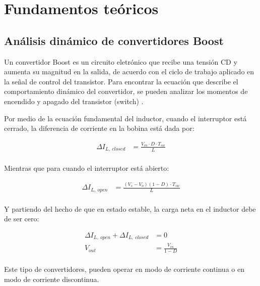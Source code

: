 \documentclass[conference]{IEEEtran}
\begin{document}
\section{Fundamentos teóricos}

\subsection{Análisis dinámico de convertidores Boost}
Un convertidor Boost es un circuito eletrónico que recibe una tensión CD y aumenta su magnitud en la salida, 
de acuerdo con el ciclo de trabajo aplicado en la señal de control del transistor. Para encontrar la ecuación
que describe el comportamiento dinámico del convertidor, se pueden analizar los momentos de encendido y apagado 
del transistor (switch) \cite{hart2011power}.

Por medio de la ecuación fundamental del inductor, cuando el interruptor está cerrado, la diferencia de corriente
en la bobina está dada por:

\begin{equation}
\begin{aligned}
    \Delta I_{L,~closed} &= \frac{V_{in} \cdot D \cdot T_{sw}}{L} \\
\end{aligned}
\label{eq:deltaIL_closed}
\end{equation}

Mientras que para cuando el interruptor está abierto:

\begin{equation}
\begin{aligned}
    \Delta I_{L,~open} &= \frac{(V_s - V_o)(1 - D)\cdot T_{sw}}{L} \\
\end{aligned}
\label{eq:deltaIL_open}
\end{equation}

Y partiendo del hecho de que en estado estable, la carga neta en el inductor debe de ser cero:

\begin{equation}
\begin{aligned}
    \Delta I_{L,~open} + \Delta I_{L,~closed} &= 0 \\
    V_{out}                                   &= \frac{V_{in}}{1 - D} \\
\end{aligned}
\label{eq:deltaIL_steady}
\end{equation}

Este tipo de convertidores, pueden operar en modo de corriente continua o en modo de corriente
discontinua.
\end{document}
